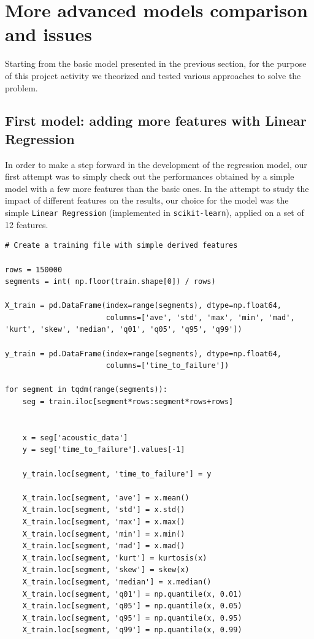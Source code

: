 \chapter{More advanced models comparison and issues}
\label{capitolo3}
\thispagestyle{empty}

\noindent Starting from the basic model presented in the previous section, for the purpose of this project activity we theorized and tested various approaches to solve the problem.

\section[First model]{First model: adding more features with Linear Regression}
\label{3.1}
In order to make a step forward in the development of the regression model, our first attempt was to simply check out the performances obtained by a simple model with a few more features than the basic ones. In the attempt to study the impact of different features on the results, our choice for the model was the simple \texttt{Linear Regression} (implemented in \texttt{scikit-learn}), applied on a set of 12 features.

\begin{lstlisting}[firstnumber=35]
# Create a training file with simple derived features

rows = 150000 
segments = int( np.floor(train.shape[0]) / rows) 

X_train = pd.DataFrame(index=range(segments), dtype=np.float64,
                       columns=['ave', 'std', 'max', 'min', 'mad', 'kurt', 'skew', 'median', 'q01', 'q05', 'q95', 'q99'])

y_train = pd.DataFrame(index=range(segments), dtype=np.float64,
                       columns=['time_to_failure'])
 
for segment in tqdm(range(segments)):
    seg = train.iloc[segment*rows:segment*rows+rows]
    

    x = seg['acoustic_data'] 
    y = seg['time_to_failure'].values[-1]
    
    y_train.loc[segment, 'time_to_failure'] = y
    
    X_train.loc[segment, 'ave'] = x.mean()
    X_train.loc[segment, 'std'] = x.std()
    X_train.loc[segment, 'max'] = x.max()
    X_train.loc[segment, 'min'] = x.min()
    X_train.loc[segment, 'mad'] = x.mad()
    X_train.loc[segment, 'kurt'] = kurtosis(x)
    X_train.loc[segment, 'skew'] = skew(x)
    X_train.loc[segment, 'median'] = x.median()
    X_train.loc[segment, 'q01'] = np.quantile(x, 0.01)
    X_train.loc[segment, 'q05'] = np.quantile(x, 0.05)
    X_train.loc[segment, 'q95'] = np.quantile(x, 0.95)
    X_train.loc[segment, 'q99'] = np.quantile(x, 0.99)
\end{lstlisting}

